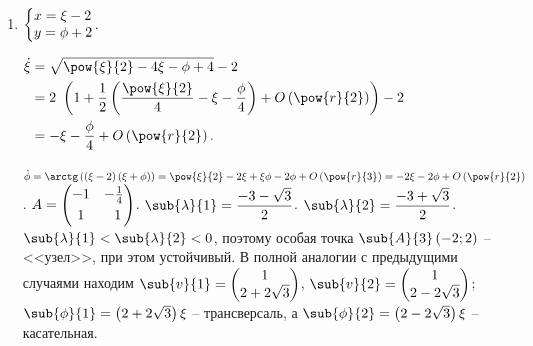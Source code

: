 \documentclass[a5paper,10pt]{article}
\begin{document}
\begin{enumerate}
    $\dot{\phi} = \arctg\br{\br{\xi + 1}\br{\xi + \phi}} 
    = \pow{\xi}{2} + \xi + \xi\phi + \phi + O\br{\pow{r}{3}} 
    = \xi + \phi + O\br{\pow{r}{2}}$.
    
    $A = \begin{pmatrix}
        \frac {1} {2} \vspace{1mm} & - \frac {1} {4} \\
        1 & \hspace{2mm} 1 \end{pmatrix}$.
    $\sub{\lambda}{1, 2} = \dfrac {3 \mp \sqrt{3} i} {4}$,
    и особая точка $\sub{A}{2}\br{1; -1}$
    является <<фокусом>>, причём неустойчивым, то есть траектории раскручиваются.
    
    В $\tsys{\xi = -0,6 \\ \phi = 0,6}$ для 
    $\tsys{
        \dot{\xi} = \sqrt{\pow{\xi}{2} + 2\xi - \phi + 4} - 2
        \\ \dot{\phi} = \arctg\br{\br{\xi + 1}\br{\xi + \phi}}
    }$ имеем вектор 
    $\tsys{
        \dot{\xi}\br{-0,6; 0,6} = -0,4 \\
        \dot{\phi}\br{-0,6; 0,6} = 0}.$
    А следовательно, направление раскручивания траекторий -- против часовой.
    
    \item $\tsys{
        x = \xi - 2 \\
        y = \phi + 2
    }$.
    
    $\begin{aligned}
        \dot{\xi} & = \sqrt{\pow{\xi}{2} - 4\xi - \phi + 4} - 2 \\
        & = 2\ \br{1 + \dfrac {1} {2} \br{\dfrac {\pow{\xi}{2}} {4} 
        - \xi - \dfrac {\phi} {4}} + O\br{\pow{r}{2}}} - 2 \\
        & = -\xi - \dfrac {\phi} {4} + O\br{\pow{r}{2}}.
    \end{aligned}$
    
    $\dot{\phi} = \arctg\br{\br{\xi - 2} \br{\xi + \phi}}
    = \pow{\xi}{2} - 2\xi + \xi \phi - 2\phi + O\br{\pow{r}{3}}
    = -2\xi - 2\phi + O\br{\pow{r}{2}}$.
    $A = \begin{pmatrix} -1 \vspace{1mm} & - \frac {1} {4}  \\ 1 & \hspace{2mm} 1 \end{pmatrix}$.
    $\sub{\lambda}{1} = \dfrac {-3 - \sqrt{3}} {2}$.
    $\sub{\lambda}{2} = \dfrac {-3 + \sqrt{3}} {2}$.
    $\sub{\lambda}{1} < \sub{\lambda}{2} < 0$,
    поэтому особая точка $\sub{A}{3}\br{-2; 2}$
    -- <<узел>>, при этом устойчивый.
    В полной аналогии с предыдущими случаями находим
    $\sub{v}{1} = \begin{pmatrix} 1 \\ 2 + 2\sqrt{3} \end{pmatrix}$,
    $\sub{v}{2} = \begin{pmatrix} 1 \\ 2 - 2\sqrt{3} \end{pmatrix}$;
    $\sub{\phi}{1} = \br{2 + 2\sqrt{3}} \xi$ -- трансверсаль, а
    $\sub{\phi}{2} = \br{2 - 2\sqrt{3}} \xi$ -- касательная.
\end{enumerate}
\end{document}
